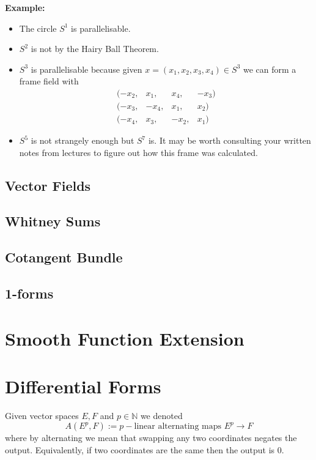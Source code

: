 \documentclass[11pt]{article}
\newcommand{\defeq}{:=}
\newcommand{\N}{\mathbb{N}}
\newenvironment{defin}
	{\begin{mdframed}[backgroundcolor=white, roundcorner=5pt, linewidth=1pt, linecolor=Green]
		\setlength{\parindent}{0pt}}
	{\end{mdframed}}
\newenvironment{eg}
	{\begin{mdframed}[backgroundcolor=mylg,roundcorner=5pt,linewidth=0pt]\bfseries{Example:}\normalfont
	\setlength{\parindent}{0pt}}
	{\end{mdframed}}
\begin{document}
\begin{eg}
	\begin{itemize}
		\item The circle $S^1$ is parallelisable.
		\item $S^2$ is not by the Hairy Ball Theorem.
		\item $S^3$ is parallelisable because given $x=(x_1, x_2, x_3, x_4)\in S^3$ we can form a frame field with
			\[
			\begin{array}{rrrr}
				(-x_2,& x_1,& x_4,& -x_3)\\
				(-x_3,&- x_4,& x_1,& x_2)\\
				(-x_4,& x_3,& -x_2,& x_1)
			\end{array}
			\]
		\item $S^5$ is not strangely enough but $S^7$ is.
			It may be worth consulting your written notes from lectures to figure out how this frame was calculated.
	\end{itemize}
\end{eg}

\subsection{Vector Fields}

\subsection{Whitney Sums}

\subsection{Cotangent Bundle}

\subsection{1-forms}


\section{Smooth Function Extension}

\section{Differential Forms}
\begin{defin}
Given vector spaces $E, F$ and $p\in \N$ we denoted
\[
	A(E^p, F)\defeq p-\text{linear alternating maps }E^p\to F
\]
where by alternating we mean that swapping any two coordinates negates the output.
Equivalently, if two coordinates are the same then the output is $0$.
\end{defin}
\end{document}
